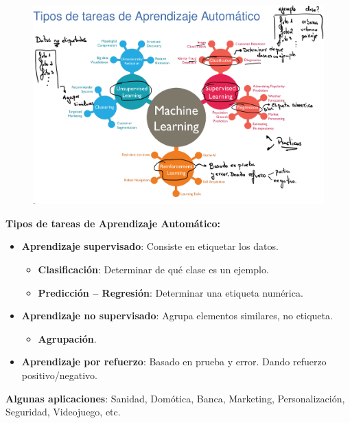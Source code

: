 \documentclass[12pt]{report} %
\begin{document}
\begin{figure}[H]
	{\includegraphics[scale=.2]{Untitled 2.png}}
\end{figure}
\pagebreak
\textbf{Tipos de tareas de Aprendizaje Automático:}
\begin{itemize}

\item
  \textbf{Aprendizaje supervisado}: Consiste en etiquetar los datos.

  \begin{itemize}
  
  \item
    \textbf{Clasificación}: Determinar de qué clase es un ejemplo.
    
  \item
    \textbf{Predicción -- Regresión}: Determinar una etiqueta numérica.

  \end{itemize}
\item
  \textbf{Aprendizaje no supervisado}: Agrupa elementos similares, no
  etiqueta.

  \begin{itemize}
  
  \item
    \textbf{Agrupación}.
  \end{itemize}
\item
  \textbf{Aprendizaje por refuerzo}: Basado en prueba y error. Dando
  refuerzo positivo/negativo.
\end{itemize}

\textbf{Algunas aplicaciones}: Sanidad, Domótica, Banca, Marketing,
Personalización, Seguridad, Videojuego, etc.
\end{document}
